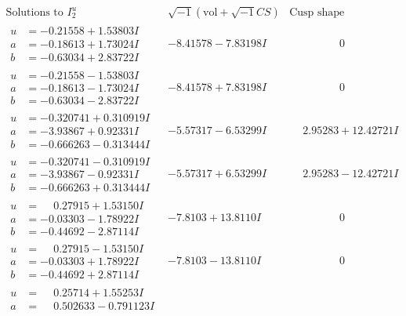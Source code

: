 \documentclass[1p]{elsarticle_modified}
\theoremstyle{definition}
\newcommand{\I}{\sqrt{-1}}
\begin{document}
$$\begin{array}{c|c|c}
\text{Solutions to }I^u_{2}& \I (\text{vol} + \sqrt{-1}CS) & \text{Cusp shape}\\
 \hline 
\begin{aligned}
u &= -0.21558 + 1.53803 I \\
a &= -0.18613 + 1.73024 I \\
b &= -0.63034 + 2.83722 I\end{aligned}
 & -8.41578 - 7.83198 I & \phantom{-0.000000 } 0 \\ \hline\begin{aligned}
u &= -0.21558 - 1.53803 I \\
a &= -0.18613 - 1.73024 I \\
b &= -0.63034 - 2.83722 I\end{aligned}
 & -8.41578 + 7.83198 I & \phantom{-0.000000 } 0 \\ \hline\begin{aligned}
u &= -0.320741 + 0.310919 I \\
a &= -3.93867 + 0.92331 I \\
b &= -0.666263 - 0.313444 I\end{aligned}
 & -5.57317 - 6.53299 I & \phantom{-}2.95283 + 12.42721 I \\ \hline\begin{aligned}
u &= -0.320741 - 0.310919 I \\
a &= -3.93867 - 0.92331 I \\
b &= -0.666263 + 0.313444 I\end{aligned}
 & -5.57317 + 6.53299 I & \phantom{-}2.95283 - 12.42721 I \\ \hline\begin{aligned}
u &= \phantom{-}0.27915 + 1.53150 I \\
a &= -0.03303 - 1.78922 I \\
b &= -0.44692 - 2.87114 I\end{aligned}
 & -7.8103 + 13.8110 I & \phantom{-0.000000 } 0 \\ \hline\begin{aligned}
u &= \phantom{-}0.27915 - 1.53150 I \\
a &= -0.03303 + 1.78922 I \\
b &= -0.44692 + 2.87114 I\end{aligned}
 & -7.8103 - 13.8110 I & \phantom{-0.000000 } 0 \\ \hline\begin{aligned}
u &= \phantom{-}0.25714 + 1.55253 I \\
a &= \phantom{-}0.502633 - 0.791123 I \\

\end{aligned}
\end{array}$$
\end{document}
